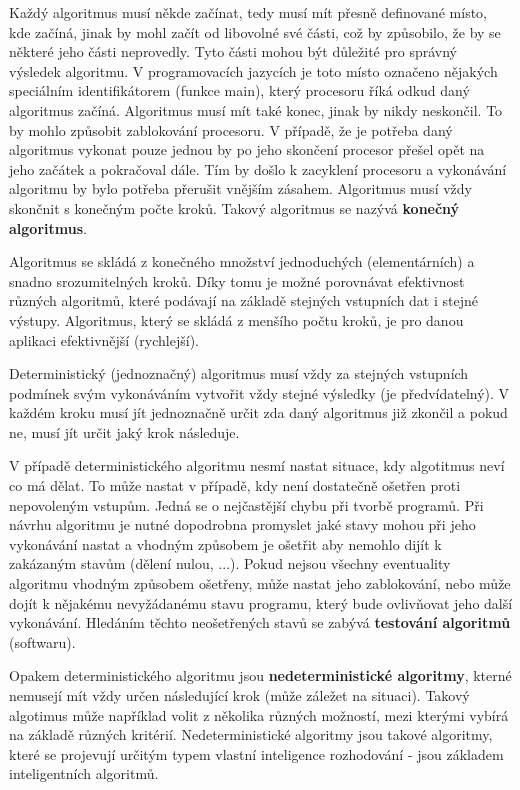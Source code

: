 
Každý algoritmus musí někde začínat, tedy musí mít přesně definované místo, kde začíná, jinak by mohl začít od libovolné své části, což by způsobilo, že by se některé jeho části neprovedly. Tyto části mohou být důležité pro správný výsledek algoritmu. V programovacích jazycích je toto místo označeno nějakých speciálním identifikátorem (funkce main), který procesoru říká odkud daný algoritmus začíná.
Algoritmus musí mít také konec, jinak by nikdy neskončil. To by mohlo způsobit zablokování procesoru. V případě, že je potřeba daný algoritmus vykonat pouze jednou by po jeho skončení procesor přešel opět na jeho začátek a pokračoval dále. Tím by došlo k zacyklení procesoru a vykonávání algoritmu by bylo potřeba přerušit vnějším zásahem. Algoritmus musí vždy skončnit s konečným počte kroků. Takový algoritmus se nazývá {\bf konečný algoritmus}.


Algoritmus se skládá z konečného množství jednoduchých (elementárních) a snadno srozumitelných kroků. Díky tomu je možné porovnávat efektivnost různých algoritmů, které podávají na základě stejných vstupních dat i stejné výstupy. Algoritmus, který se skládá z menšího počtu kroků, je pro danou aplikaci efektivnější (rychlejší).


Deterministický (jednoznačný) algoritmus musí vždy za stejných vstupních podmínek svým vykonáváním vytvořit vždy stejné výsledky (je předvídatelný). V každém kroku musí jít jednoznačně určit zda daný algoritmus již zkončil a pokud ne, musí jít určit jaký krok následuje. 

V případě deterministického algoritmu nesmí nastat situace, kdy algotitmus neví co má dělat. To může nastat v případě, kdy není dostatečně ošetřen proti nepovoleným vstupům. Jedná se o nejčastější chybu při tvorbě programů. Při návrhu algoritmu je nutné dopodrobna promyslet jaké stavy mohou při jeho vykonávání nastat a vhodným způsobem je ošetřit aby nemohlo dijít k zakázaným stavům (dělení nulou, ...). Pokud nejsou všechny eventuality algoritmu vhodným způsobem ošetřeny, může nastat jeho zablokování, nebo může dojít k nějakému nevyžádanému stavu programu, který bude ovlivňovat jeho další vykonávání. Hledáním těchto neošetřených stavů se zabývá {\bf testování algoritmů} (softwaru). 

Opakem deterministického algoritmu jsou {\bf nedeterministické algoritmy}, kterné nemusejí mít vždy určen následující krok (může záležet na situaci). Takový algotimus může například volit z několika různých možností, mezi kterými vybírá na základě různých kritérií. Nedeterministické algoritmy jsou takové algoritmy, které se projevují určitým typem vlastní inteligence rozhodování - jsou základem inteligentních algoritmů.

